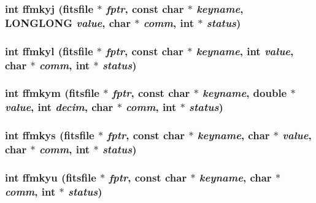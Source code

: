 \subsubsection{\setlength{\rightskip}{0pt plus 5cm}int ffmkyj (\bf{fitsfile} $\ast$ {\em fptr}, const char $\ast$ {\em keyname}, \bf{LONGLONG} {\em value}, char $\ast$ {\em comm}, int $\ast$ {\em status})}\label{fitsio__64_8h_9337d5f08bcd5c82afc87256596ded23}


\subsubsection{\setlength{\rightskip}{0pt plus 5cm}int ffmkyl (\bf{fitsfile} $\ast$ {\em fptr}, const char $\ast$ {\em keyname}, int {\em value}, char $\ast$ {\em comm}, int $\ast$ {\em status})}\label{fitsio__64_8h_b0edcf1260c7df986e19da627da36ee1}


\subsubsection{\setlength{\rightskip}{0pt plus 5cm}int ffmkym (\bf{fitsfile} $\ast$ {\em fptr}, const char $\ast$ {\em keyname}, double $\ast$ {\em value}, int {\em decim}, char $\ast$ {\em comm}, int $\ast$ {\em status})}\label{fitsio__64_8h_2e1ce1cd4c5dec3d5966edd8febeb9c0}


\subsubsection{\setlength{\rightskip}{0pt plus 5cm}int ffmkys (\bf{fitsfile} $\ast$ {\em fptr}, const char $\ast$ {\em keyname}, char $\ast$ {\em value}, char $\ast$ {\em comm}, int $\ast$ {\em status})}\label{fitsio__64_8h_4de4d8a5bcc63ae6b2aa1162d5173147}


\subsubsection{\setlength{\rightskip}{0pt plus 5cm}int ffmkyu (\bf{fitsfile} $\ast$ {\em fptr}, const char $\ast$ {\em keyname}, char $\ast$ {\em comm}, int $\ast$ {\em status})}\label{fitsio__64_8h_a130f6faad71e05cd648b6f0443a6fc1}


